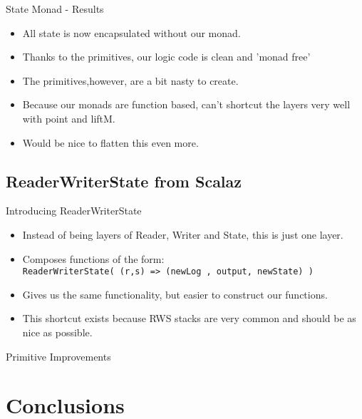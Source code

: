 \documentclass[professionalFonts,aspectratio=169]{beamer}
\begin{document}
\begin{frame}{State Monad - Results}

\begin{itemize}
\item All state is now encapsulated without our monad.
\pause \item Thanks to the primitives, our logic code is clean and 'monad free'
\pause \item The primitives,however, are a bit nasty to create.
\pause \item Because our monads are function based, can't shortcut the layers
very well with point and liftM.
\pause \item Would be nice to flatten this even more.
\end{itemize}

\end{frame}

\subsection{ReaderWriterState from Scalaz}

\begin{frame}{Introducing ReaderWriterState}
\begin{itemize}
\item Instead of being layers of Reader, Writer and State, this is just one layer.
\pause \item Composes functions of the form: \\ \texttt{ReaderWriterState( (r,s) =>
(newLog , output, newState) )}
\pause \item Gives us the same functionality, but easier to construct our
functions.
\pause \item This shortcut exists because RWS stacks are very common and should
be as nice as possible.
\end{itemize}
\end{frame}

\begin{frame}{Primitive Improvements}





\end{frame}

\section{Conclusions}
\end{document}
